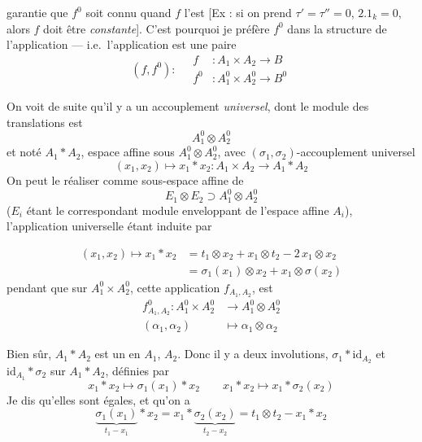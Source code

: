 \documentclass[11pt,a4paper]{article}
\begin{document}
garantie que $f^0$ soit connu quand $f$ l'est [Ex : si on prend $\tau' = \tau'' = 0$, $2.1_k = 0$, alors $f$ doit être \emph{constante}]. C'est pourquoi je préfère  $f^0$ dans la structure de l'application --- i.e.\ l'application est une paire
\[
  (f, f^0) : \quad
  \begin{aligned}
    f &: A_1 \times A_2 \longrightarrow B \\
    f^0 &: A_1^0 \times A_2^0 \longrightarrow B^0
  \end{aligned}
\]

On voit  de suite qu'il y a un accouplement \emph{universel}, dont le module des translations est
\[
  A_1^0 \otimes A_2^0
\]
et \struck{\ill{}} noté $A_1 * A_2$, espace affine sous $A_1^0 \otimes A_2^0$, avec $(\sigma_1, \sigma_2)$-accouplement universel
\[
  (x_1, x_2) \longmapsto x_1 * x_2 : A_1 \times A_2 \longrightarrow A_1 * A_2
\]
On peut le réaliser comme sous-espace affine de
\[
  E_1 \otimes E_2 \supset A_1^0 \otimes A_2^0
\]
($E_i$ étant le correspondant module enveloppant de l'espace affine $A_i$), l'application universelle étant induite par

\[
  \boxed{\;
  \begin{aligned}
    (x_1, x_2) \longmapsto x_1 * x_2 &= t_1 \otimes x_2 + x_1 \otimes t_2 - 2\, x_1 \otimes x_2 \\
    &= \sigma_1(x_1) \otimes x_2 + x_1 \otimes \sigma(x_2)
  \end{aligned}
  \;}
\]
pendant que sur $A_1^0 \times A_2^0$, cette application $f_{A_1, A_2}$, est
\[
  \begin{aligned}
    f^0_{A_1, A_2} : A_1^0 \times A_2^0 &\longrightarrow A_1^0 \otimes A_2^0 \\
    (\alpha_1, \alpha_2) &\longmapsto \alpha_1 \otimes \alpha_2
  \end{aligned}
\]


\struck{\ill{}} Bien sûr, $A_1 * A_2$ est un  en $A_1$, $A_2$. Donc il y a deux involutions, $\sigma_1 * \mathrm{id}_{A_2}$ et $\mathrm{id}_{A_1} * \sigma_2$ sur $A_1 * A_2$, définies par
\[
  x_1 * x_2 \longmapsto \sigma_1(x_1) * x_2 \qquad x_1 * x_2 \longmapsto x_1 * \sigma_2(x_2)
\]
Je dis qu'elles sont égales, et qu'on a
\[
  \underset{t_1 - x_1}{\underbrace{\sigma_1(x_1)}} * x_2 = x_1 * \underset{t_2 - x_2}{\underbrace{\sigma_2(x_2)}} = t_1 \otimes t_2 - x_1 * x_2
\]
\end{document}
